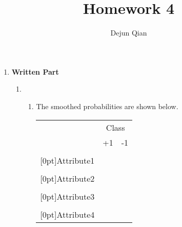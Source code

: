 \documentclass[11pt,letterpaper,oneside]{article}
\title{Homework 4}
\author{Dejun Qian}
\date{}
\begin{document}
\maketitle

\begin{enumerate}
\item \textbf{Written Part}
  \begin{enumerate}
  \item 
    \begin{enumerate}
    \item The smoothed probabilities are shown below.

  \begin{tabular}{l|cc}
     & \multicolumn{2}{c}{Class}\\
     \cline{2-3}
     & +1 & -1\\ \hline
                                     & \cellcolor[gray]{0.9}{$P(Attribute1=1\ | +1) = \frac{3+1}{4+2} = \frac{4}{6}$} & \cellcolor[gray]{0.9}{$P(Attribute1=1\ | -1) = \frac{2+1}{4+2} = \frac{3}{6}$}\\
    \raisebox{1.5ex}[0pt]{Attribute1}& \cellcolor[gray]{0.7}{$P(Attribute1=0\ | +1) = \frac{1+1}{4+2} = \frac{2}{6}$} & \cellcolor[gray]{0.7}{$P(Attribute1=0\ | -1) = \frac{2+1}{4+2} = \frac{3}{6}$}\\
                                     & \cellcolor[gray]{0.9}{$P(Attribute2=1\ | +1) = \frac{3+1}{4+2} = \frac{4}{6}$} & \cellcolor[gray]{0.9}{$P(Attribute2=1\ | -1) = \frac{1+1}{4+2} = \frac{2}{6}$}\\
    \raisebox{1.5ex}[0pt]{Attribute2}& \cellcolor[gray]{0.7}{$P(Attribute2=0\ | +1) = \frac{1+1}{4+2} = \frac{2}{6}$} & \cellcolor[gray]{0.7}{$P(Attribute2=0\ | -1) = \frac{3+1}{4+2} = \frac{4}{6}$}\\
                                     & \cellcolor[gray]{0.9}{$P(Attribute3=1\ | +1) = \frac{2+1}{4+2} = \frac{3}{6}$} & \cellcolor[gray]{0.9}{$P(Attribute3=1\ | -1) = \frac{2+1}{4+2} = \frac{3}{6}$}\\
    \raisebox{1.5ex}[0pt]{Attribute3}& \cellcolor[gray]{0.7}{$P(Attribute3=0\ | +1) = \frac{2+1}{4+2} = \frac{3}{6}$} & \cellcolor[gray]{0.7}{$P(Attribute3=0\ | -1) = \frac{2+1}{4+2} = \frac{3}{6}$}\\
                                     & \cellcolor[gray]{0.9}{$P(Attribute4=1\ | +1) = \frac{3+1}{4+2} = \frac{4}{6}$} & \cellcolor[gray]{0.9}{$P(Attribute2=1\ | -1) = \frac{0+1}{4+2} = \frac{1}{6}$}\\
    \raisebox{1.5ex}[0pt]{Attribute4}& \cellcolor[gray]{0.7}{$P(Attribute4=0\ | +1) = \frac{1+1}{4+2} = \frac{2}{6}$} & \cellcolor[gray]{0.7}{$P(Attribute2=0\ | -1) = \frac{4+1}{4+2} = \frac{5}{6}$}\\
  \end{tabular}



\end{enumerate}
\end{enumerate}
\end{enumerate}
\end{document}
